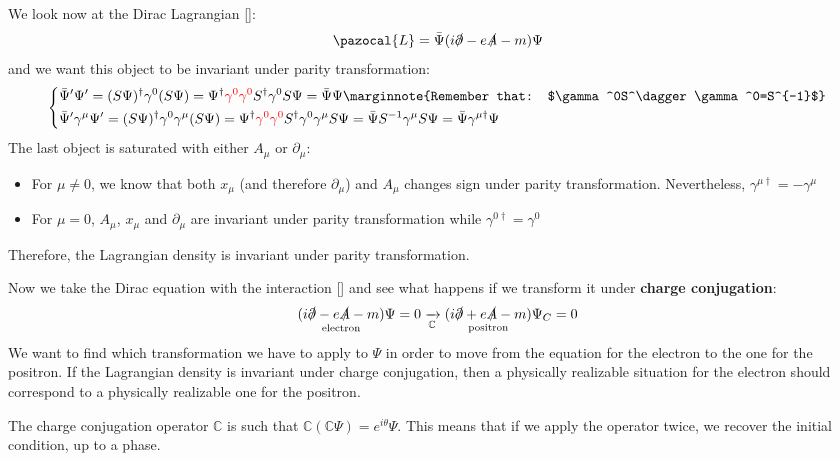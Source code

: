 \documentclass[../main.tex]{subfiles}
\begin{document}
We look now at the Dirac Lagrangian []:
\[
\pazocal{L}=\bar{\Psi}(i\slashed{\partial}-e\slashed{A}-m)\Psi
\]
and we want this object to be invariant under parity transformation:
\[
\left\{
\begin{aligned}
&\bar{\Psi}'\Psi'=(S\Psi)^\dagger\gamma^0(S\Psi)=\Psi^\dagger{\color{red}\gamma^0\gamma^0}S^\dagger\gamma^0S\Psi=\bar{\Psi}\Psi\marginnote{Remember that: $\gamma^0S^\dagger\gamma^0=S^{-1}$}\\
&\bar{\Psi}'\gamma^\mu\Psi'=(S\Psi)^\dagger\gamma^0\gamma^\mu(S\Psi)=\Psi^\dagger{\color{red}\gamma^0\gamma^0}S^\dagger\gamma^0\gamma^\mu S\Psi=\bar{\Psi}S^{-1}\gamma^\mu S\Psi=\bar{\Psi}\gamma^{\mu\dagger}\Psi
\end{aligned}
\right.
\]
The last object is saturated with either $A_\mu$
or $\partial_\mu$:
\begin{itemize}
    \item For $\mu\neq0$, we know that both $x_\mu$ (and therefore $\partial_\mu$) and $A_\mu$ changes sign under parity transformation. Nevertheless, $\gamma^{\mu\dagger}=-\gamma^\mu$
    \item For $\mu=0$, $A_\mu$, $x_\mu$ and $\partial_\mu$ are invariant under parity transformation while $\gamma^{0\dagger}=\gamma^0$
\end{itemize} 
Therefore, the Lagrangian density is invariant under parity transformation.

Now we take the Dirac equation with the interaction [] and see what happens if we transform it under \textbf{charge conjugation}:
\[
\underset{\text{electron}}{(i\slashed{\partial}-e\slashed{A}-m)}\Psi=0\xrightarrow[\mathbb{C}]{}\underset{\text{positron}}{(i\slashed{\partial}+e\slashed{A}-m)}\Psi_C=0
\]
We want to find which transformation we have to apply to $\Psi$ in order to move from the equation for the electron to the one for the positron. If the Lagrangian density is invariant under charge conjugation, then a physically realizable situation for the electron should correspond to a physically realizable one for the positron.

The charge conjugation operator $\mathbb{C}$ is such that $\mathbb{C}(\mathbb{C}\Psi)=e^{i\theta}\Psi$. This means that if we apply the operator twice, we recover the initial condition, up to a phase.
\end{document}
